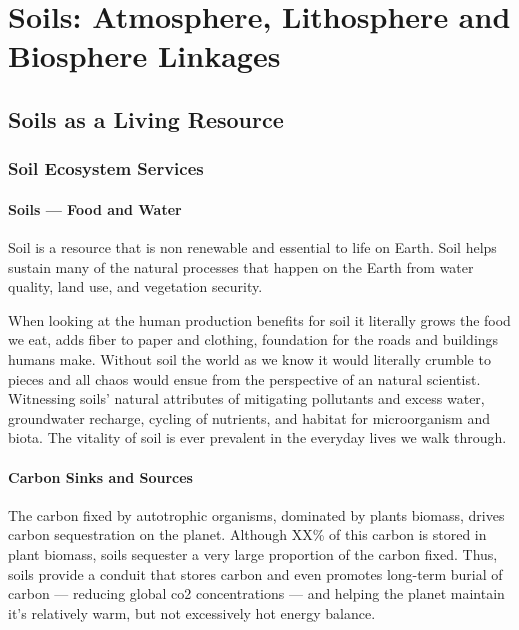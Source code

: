 \chapter[Soils]{Soils: Atmosphere, Lithosphere and Biosphere Linkages}\label{ch:soils}

\section[A Living Resources]{Soils as a Living Resource}

\subsection{Soil Ecosystem Services}

\subsubsection{Soils --- Food and Water}

Soil is a resource that is non renewable and essential to life on Earth. Soil helps sustain many of the natural processes that happen on the Earth from water quality, land use, and vegetation security. 

When looking at the human production benefits for soil it literally grows the food we eat, adds fiber to paper and clothing, foundation for the roads and buildings humans make. Without soil the world as we know it would literally crumble to pieces and all chaos would ensue from the perspective of an natural scientist. Witnessing soils' natural attributes of mitigating pollutants and excess water, groundwater recharge, cycling of nutrients, and habitat for microorganism and biota. The vitality of soil is ever prevalent in the everyday lives we walk through.


\subsubsection{Carbon Sinks and Sources}

The carbon fixed by autotrophic organisms, dominated by plants biomass, drives carbon sequestration on the planet. Although XX\% of this carbon is stored in plant biomass, soils sequester a very large proportion of the carbon fixed. Thus, soils provide a conduit that stores carbon and even promotes long-term burial of carbon --- reducing global co2 concentrations --- and helping the planet maintain it's relatively warm, but not excessively hot energy balance. 


